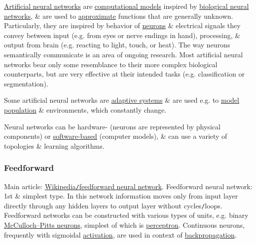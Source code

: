 \documentclass{article}
\begin{document}
\href{https://en.wikipedia.org/wiki/Artificial_neural_network}{Artificial neural networks} are \href{https://en.wikipedia.org/wiki/Computational_model}{computational models} inspired by \href{https://en.wikipedia.org/wiki/Biological_neural_network}{biological neural networks}, \& are used to \href{https://en.wikipedia.org/wiki/Universal_approximation_theorem}{approximate} functions that are generally unknown. Particularly, they are inspired by behavior of \href{https://en.wikipedia.org/wiki/Neuron}{neurons} \& electrical signals they convey between input (e.g. from eyes or nerve endings in hand), processing, \& output from brain (e.g. reacting to light, touch, or heat). The way neurons semantically communicate is an area of ongoing research. Most artificial neural networks bear only some resemblance to their more complex biological counterparts, but are very effective at their intended tasks (e.g. classification or segmentation).

Some artificial neural networks are \href{https://en.wikipedia.org/wiki/Adaptive_system}{adaptive systems} \& are used e.g. to \href{https://en.wikipedia.org/wiki/Population_model}{model population} \& environments, which constantly change.

Neural networks can be hardware- (neurons are represented by physical components) or \href{https://en.wikipedia.org/wiki/Neural_network_software}{software-based} (computer models), \& can use a variety of topologies \& learning algorithms.

\subsubsection{Feedforward}
Main article: \href{https://en.wikipedia.org/wiki/Feedforward_neural_network}{Wikipedia{\tt/}feedforward neural network}. Feedforward neural network: 1st \& simplest type. In this network information moves only from input layer directly through any hidden layers to output layer without cycles{\tt/}loops. Feedforward networks can be constructed with various types of units, e.g. binary \href{https://en.wikipedia.org/wiki/McCulloch%E2%80%93Pitts_neuron}{McCulloch--Pitts neurons}, simplest of which is \href{https://en.wikipedia.org/wiki/Perceptron}{perceptron}. Continuous neurons, frequently with sigmoidal \href{https://en.wikipedia.org/wiki/Activation_function}{activation}, are used in context of \href{https://en.wikipedia.org/wiki/Backpropagation}{backpropagation}.
\end{document}

